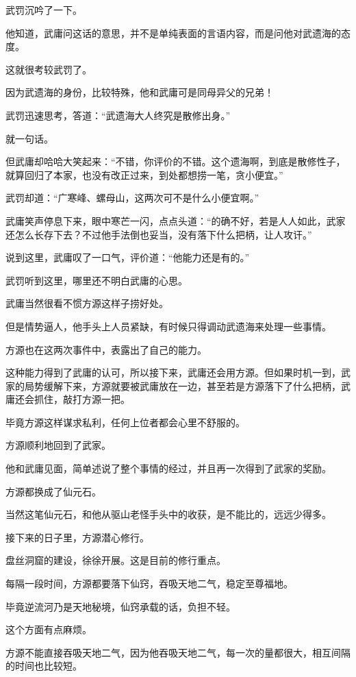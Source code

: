 \begin{this_body}
武罚沉吟了一下。

他知道，武庸问这话的意思，并不是单纯表面的言语内容，而是问他对武遗海的态度。

这就很考较武罚了。

因为武遗海的身份，比较特殊，他和武庸可是同母异父的兄弟！

武罚迅速思考，答道：“武遗海大人终究是散修出身。”

就一句话。

但武庸却哈哈大笑起来：“不错，你评价的不错。这个遗海啊，到底是散修性子，就算回归了本家，也没有改正过来，到处都想捞一笔，贪小便宜。”

武罚却道：“广寒峰、螺母山，这两次可不是什么小便宜啊。”

武庸笑声停息下来，眼中寒芒一闪，点点头道：“的确不好，若是人人如此，武家还怎么长存下去？不过他手法倒也妥当，没有落下什么把柄，让人攻讦。”

说到这里，武庸叹了一口气，评价道：“他能力还是有的。”

武罚听到这里，哪里还不明白武庸的心思。

武庸当然很看不惯方源这样子捞好处。

但是情势逼人，他手头上人员紧缺，有时候只得调动武遗海来处理一些事情。

方源也在这两次事件中，表露出了自己的能力。

这种能力得到了武庸的认可，所以接下来，武庸还会用方源。但如果时机一到，武家的局势缓解下来，方源就要被武庸放在一边，甚至若是方源落下了什么把柄，武庸还会抓住，敲打方源一把。

毕竟方源这样谋求私利，任何上位者都会心里不舒服的。

方源顺利地回到了武家。

他和武庸见面，简单述说了整个事情的经过，并且再一次得到了武家的奖励。

方源都换成了仙元石。

当然这笔仙元石，和他从驱山老怪手头中的收获，是不能比的，远远少得多。

接下来的日子里，方源潜心修行。

盘丝洞窟的建设，徐徐开展。这是目前的修行重点。

每隔一段时间，方源都要落下仙窍，吞吸天地二气，稳定至尊福地。

毕竟逆流河乃是天地秘境，仙窍承载的话，负担不轻。

这个方面有点麻烦。

方源不能直接吞吸天地二气，因为他吞吸天地二气，每一次的量都很大，相互间隔的时间也比较短。


\end{this_body}
